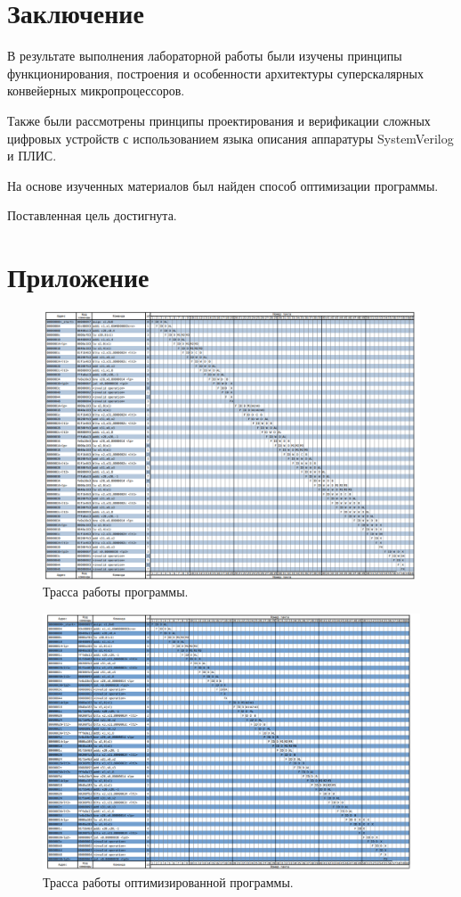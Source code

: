 \chapter*{Заключение}

В результате выполнения лабораторной работы были изучены принципы функционирования, построения и особенности архитектуры суперскалярных конвейерных микропроцессоров.

Также были рассмотрены принципы проектирования и верификации сложных цифровых устройств с использованием языка описания аппаратуры SystemVerilog и ПЛИС.

На основе изученных материалов был найден способ оптимизации программы.

Поставленная цель достигнута.

\chapter*{Приложение}

\begin{figure}[h]
	\centering
	\includegraphics[height=0.33\textheight]{img/pipeline}
	\caption{Трасса работы программы.}
\end{figure}

\begin{figure}[h]
	\centering
	\includegraphics[height=0.33\textheight]{img/pipeline_op}
	\caption{Трасса работы оптимизированной программы.}
\end{figure}

